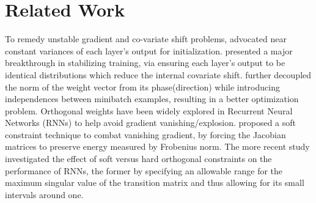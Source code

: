 \documentclass{article}
\begin{document}
\section{Related Work}
To remedy unstable gradient and co-variate shift problems, \cite{glorot2010understanding,he2015delving} advocated near constant variances of each layer's output for initialization. \cite{ioffe2015batch} presented a major breakthrough in stabilizing training, via ensuring each layer’s output to be identical distributions which reduce the internal covariate shift.  \cite{salimans2016weight} further decoupled the norm of the weight vector from its phase(direction) while introducing independences between minibatch examples, resulting in a better optimization problem.
Orthogonal weights have been widely explored in Recurrent Neural Networks (RNNs) \cite{pascanu2013difficulty,dorobantu2016dizzyrnn,arjovsky2016unitary,mhammedi2016efficient,vorontsov2017orthogonality,wisdom2016full} to help avoid gradient vanishing/explosion.  \cite{pascanu2013difficulty} proposed a soft constraint technique to combat vanishing gradient, by forcing the Jacobian matrices to preserve energy measured by Frobenius norm. The more recent study \cite{vorontsov2017orthogonality} investigated the effect of soft versus hard orthogonal constraints on the performance of RNNs, the former by specifying an allowable range for the maximum singular value of the transition matrix and thus allowing for its small intervals around one.
\end{document}
